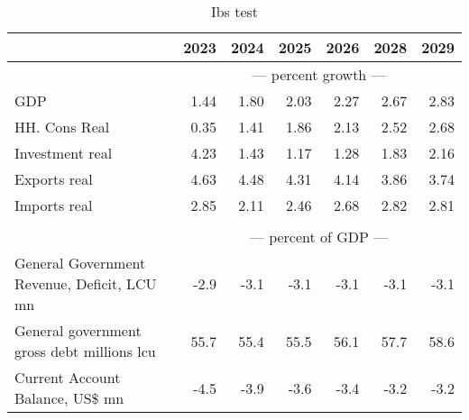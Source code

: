 \documentclass{article}
\begin{document}
\begin{table}[ht]
\caption{Ibs test}
\begin{tabular}{lrrrr|rr}
\toprule
 & 2023 & 2024 & 2025 & 2026 & 2028 & 2029 \\
\midrule
&\multicolumn{6}{c}{{--- percent growth ---}}                                     \\
GDP & 1.44 & 1.80 & 2.03 & 2.27 & 2.67 & 2.83 \\
HH. Cons Real & 0.35 & 1.41 & 1.86 & 2.13 & 2.52 & 2.68 \\
Investment real & 4.23 & 1.43 & 1.17 & 1.28 & 1.83 & 2.16 \\
Exports real & 4.63 & 4.48 & 4.31 & 4.14 & 3.86 & 3.74 \\
Imports real & 2.85 & 2.11 & 2.46 & 2.68 & 2.82 & 2.81 \\
&\multicolumn{6}{c}{{}}                                     \\
&\multicolumn{6}{c}{{--- percent of GDP ---}}                                     \\
General Government Revenue, Deficit, LCU mn & -2.9 & -3.1 & -3.1 & -3.1 & -3.1 & -3.1 \\
General government gross debt millions lcu & 55.7 & 55.4 & 55.5 & 56.1 & 57.7 & 58.6 \\
Current Account Balance, US\$ mn & -4.5 & -3.9 & -3.6 & -3.4 & -3.2 & -3.2 \\
\bottomrule
\end{tabular}
\end{table}
\end{document}
